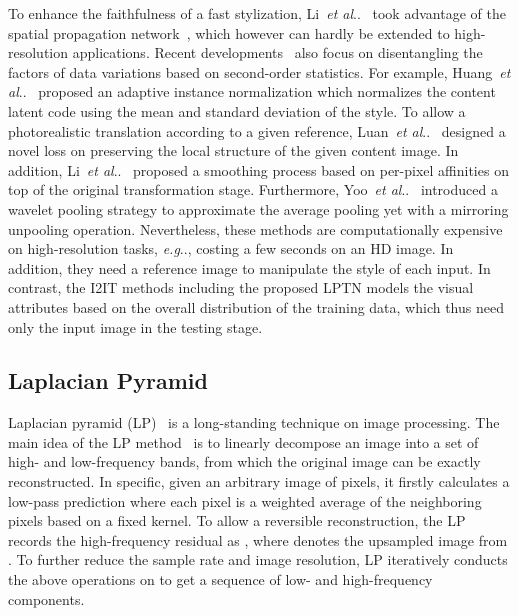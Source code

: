 \documentclass[10pt,twocolumn,letterpaper]{article}
\makeatletter
\DeclareRobustCommand\onedot{\futurelet\@let@token\@onedot}
\def\@onedot{\ifx\@let@token.\else.\null\fi\xspace}
\def\eg{\emph{e.g}\onedot} \def\Eg{\emph{E.g}\onedot}
\def\etal{\emph{et al}\onedot}
\makeatother
\begin{document}
	To enhance the faithfulness of a fast stylization, Li~\etal~\cite{li2019learning} took advantage of the spatial propagation network~\cite{liu2017learning}, which however can hardly be extended to high-resolution applications. Recent developments~\cite{Disentangler_NeurIPS2018, huang2018multimodal, lee2018diverse, gonzalez2018image, ganin2014unsupervised, yoo2019photorealistic, puy2019flexible} also focus on disentangling the factors of data variations based on second-order statistics. For example, Huang~\etal~\cite{huang2017arbitrary} proposed an adaptive instance normalization which normalizes the content latent code using the mean and standard deviation of the style. To allow a photorealistic translation according to a given reference, Luan~\etal~\cite{luan2017deep} designed a novel loss on preserving the local structure of the given content image. In addition, Li~\etal~\cite{li2018closed} proposed a smoothing process based on per-pixel affinities on top of the original transformation stage. Furthermore, Yoo~\etal~\cite{yoo2019photorealistic} introduced a wavelet pooling strategy to approximate the average pooling yet with a mirroring unpooling operation. Nevertheless, these methods are computationally expensive on high-resolution tasks, \eg, costing a few seconds on an HD image. In addition, they need a reference image to manipulate the style of each input. In contrast, the I2IT methods including the proposed LPTN models the visual attributes based on the overall distribution of the training data, which thus need only the input image in the testing stage.
	
	
	\subsection{Laplacian Pyramid}
	\label{relatedwork_laplacian}
	
	Laplacian pyramid (LP)~\cite{burt1983laplacian} is a long-standing technique on image processing. The main idea of the LP method~\cite{burt1983laplacian} is to linearly decompose an image into a set of high- and low-frequency bands, from which the original image can be exactly reconstructed. In specific, given an arbitrary image  of  pixels, it firstly calculates a low-pass prediction  where each pixel is a weighted average of the neighboring pixels based on a fixed kernel. To allow a reversible reconstruction, the LP records the high-frequency residual  as , where  denotes the upsampled image from . To further reduce the sample rate and image resolution, LP iteratively conducts the above operations on  to get a sequence of low- and high-frequency components.
	
\end{document}
